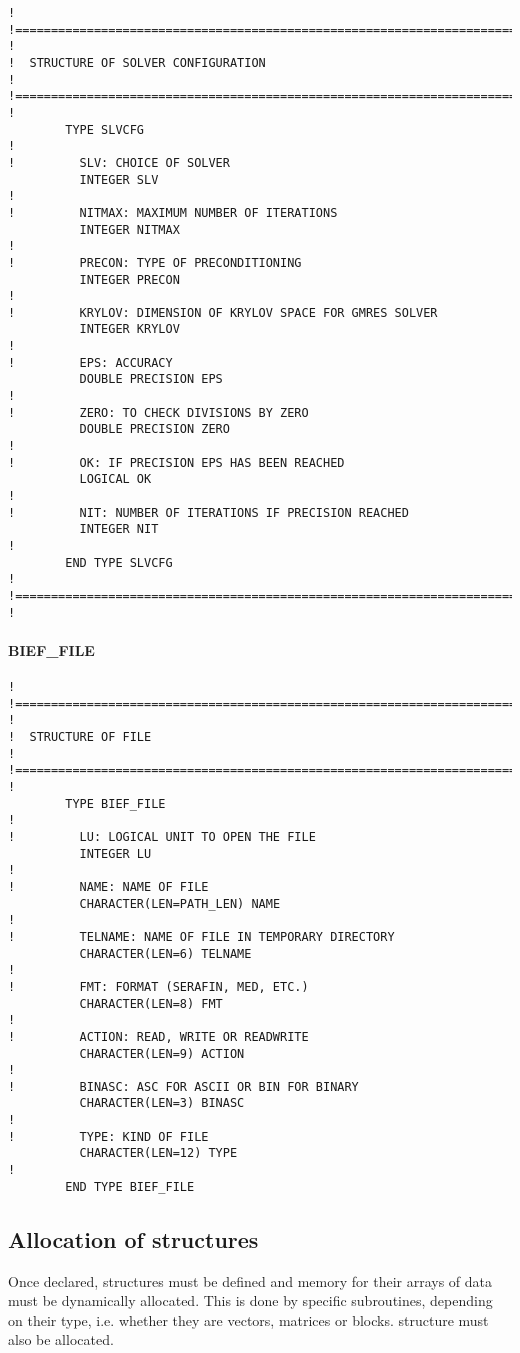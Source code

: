 \begin{lstlisting}[language=TelFortran]
!
!=======================================================================
!
!  STRUCTURE OF SOLVER CONFIGURATION
!
!=======================================================================
!
        TYPE SLVCFG
!
!         SLV: CHOICE OF SOLVER
          INTEGER SLV
!
!         NITMAX: MAXIMUM NUMBER OF ITERATIONS
          INTEGER NITMAX
!
!         PRECON: TYPE OF PRECONDITIONING
          INTEGER PRECON
!
!         KRYLOV: DIMENSION OF KRYLOV SPACE FOR GMRES SOLVER
          INTEGER KRYLOV
!
!         EPS: ACCURACY
          DOUBLE PRECISION EPS
!
!         ZERO: TO CHECK DIVISIONS BY ZERO
          DOUBLE PRECISION ZERO
!
!         OK: IF PRECISION EPS HAS BEEN REACHED
          LOGICAL OK
!
!         NIT: NUMBER OF ITERATIONS IF PRECISION REACHED
          INTEGER NIT
!
        END TYPE SLVCFG
!
!=======================================================================
!
\end{lstlisting}

\paragraph{BIEF\_FILE}

\begin{lstlisting}[language=TelFortran]
!
!=======================================================================
!
!  STRUCTURE OF FILE
!
!=======================================================================
!
        TYPE BIEF_FILE
!
!         LU: LOGICAL UNIT TO OPEN THE FILE
          INTEGER LU
!
!         NAME: NAME OF FILE
          CHARACTER(LEN=PATH_LEN) NAME
!
!         TELNAME: NAME OF FILE IN TEMPORARY DIRECTORY
          CHARACTER(LEN=6) TELNAME
!
!         FMT: FORMAT (SERAFIN, MED, ETC.)
          CHARACTER(LEN=8) FMT
!
!         ACTION: READ, WRITE OR READWRITE
          CHARACTER(LEN=9) ACTION
!
!         BINASC: ASC FOR ASCII OR BIN FOR BINARY
          CHARACTER(LEN=3) BINASC
!
!         TYPE: KIND OF FILE
          CHARACTER(LEN=12) TYPE
!
        END TYPE BIEF_FILE
\end{lstlisting}

\subsection{Allocation of structures}

Once declared,  structures must be defined and memory for
their arrays of data must be dynamically allocated. This is done by specific
subroutines, depending on their type, i.e. whether they are vectors, matrices
or blocks.  structure must also be allocated.

